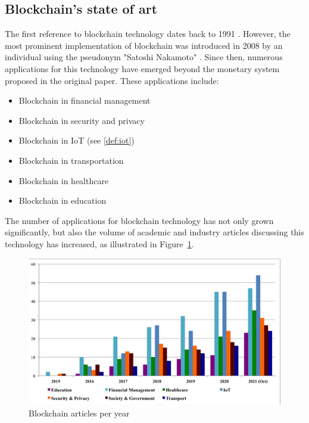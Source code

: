 \documentclass[twocolumn]{article}
\begin{document}
\subsection{Blockchain's state of art}
The first reference to blockchain technology dates back to 1991 \cite{haber1991time}. However, the most prominent implementation of blockchain was introduced in 2008 by an individual using the pseudonym "Satoshi Nakamoto" \cite{nakamoto2008bitcoin}. Since then, numerous applications for this technology have emerged beyond the monetary system proposed in the original paper. These applications include:
\begin{itemize}
    \item Blockchain in financial management \cite{pal2021blockchain}
    \item Blockchain in security and privacy \cite{taylor2020systematic}
    \item Blockchain in IoT (see \cref{def:iot}) \cite{wang2019survey}
    \item Blockchain in transportation \cite{humayun2020emerging}
    \item Blockchain in healthcare \cite{agbo2019blockchain}
    \item Blockchain in education \cite{alammary2019blockchain}
\end{itemize}
\noindent The number of applications for blockchain technology has not only grown significantly, but also the volume of academic and industry articles discussing this technology has increased, as illustrated in Figure~\ref{fig:articles_per_y}. \cite{9786734}
\begin{figure}[h]
    \centering
    \includegraphics[width=1\linewidth]{Images/yearly_blockchain_articles.png}
    \caption{Blockchain articles per year}
    \label{fig:articles_per_y}
\end{figure}
\end{document}
